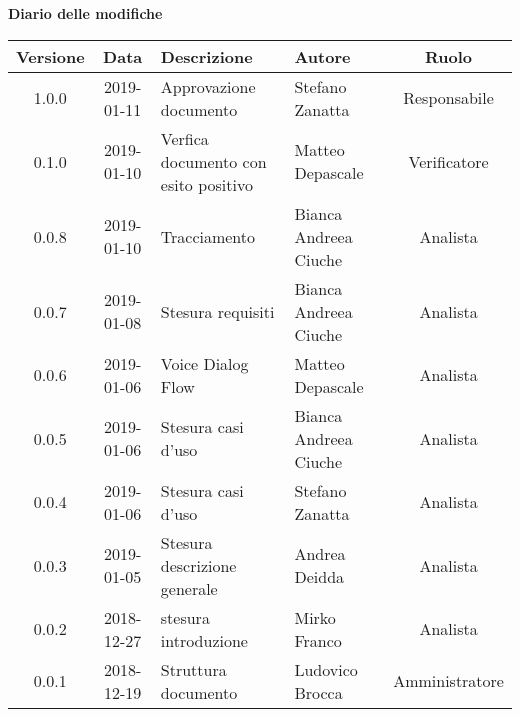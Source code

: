 	\begin{center}
		\textbf{Diario delle modifiche}
	\end{center}
	\begin{center}
		\begin{tabularx}{\textwidth}{|c|c|X|X|c|}
			\hline
			\textbf{Versione} & \textbf{Data} & \textbf{Descrizione} & \textbf{Autore} & \textbf{Ruolo} \\
			\hline
			1.0.0 & 2019-01-11 & Approvazione documento& Stefano Zanatta & Responsabile\\
			\hline
			0.1.0 & 2019-01-10 & Verfica documento con esito positivo& Matteo Depascale & Verificatore\\
			\hline
			0.0.8 & 2019-01-10 &Tracciamento& Bianca Andreea Ciuche& Analista\\
			\hline
			0.0.7 & 2019-01-08 &Stesura requisiti & Bianca Andreea Ciuche& Analista\\
			\hline
			0.0.6 & 2019-01-06 & Voice Dialog Flow & Matteo Depascale & Analista\\
			\hline
			0.0.5 & 2019-01-06 & Stesura casi d'uso& Bianca Andreea Ciuche & Analista\\
			\hline
			0.0.4 & 2019-01-06 & Stesura casi d'uso& Stefano Zanatta & Analista\\
			\hline
			0.0.3 & 2019-01-05 & Stesura descrizione generale& Andrea Deidda & Analista\\
			\hline
			0.0.2 & 2018-12-27 & stesura introduzione & Mirko Franco & Analista\\
			\hline
			0.0.1 & 2018-12-19 & Struttura documento & Ludovico Brocca & Amministratore\\
			\hline
		\end{tabularx}
	\end{center}
\newpage